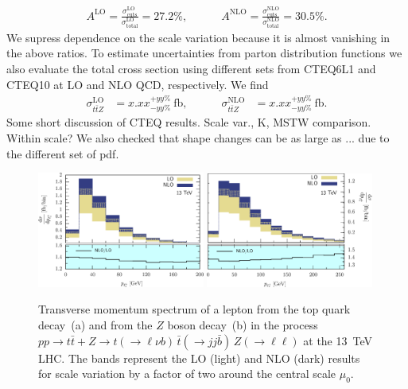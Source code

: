 \documentclass[preprint]{JHEP3} %
\def\ttb{t\bar{t}}
\newcommand{\be}{\begin{eqnarray}}
\newcommand{\ee}{\end{eqnarray}}
\begin{document}
\be
  A^\mathrm{LO} = \frac{\sigma_{\mathrm{cuts}}^\mathrm{LO}}{\sigma_{\mathrm{total}}^\mathrm{LO}} = 27.2 \% ,
  \quad\quad\quad
  A^\mathrm{NLO} = \frac{\sigma_{\mathrm{cuts}}^\mathrm{NLO}}{\sigma_{\mathrm{total}}^\mathrm{NLO}} = 30.5 \%.
\ee
We supress dependence on the scale variation because it is almost vanishing in the above ratios.
To estimate uncertainties from parton distribution functions we also evaluate the total cross section
using different sets from CTEQ6L1 \cite{} and CTEQ10 \cite{} at LO and NLO QCD, respectively. 
We find 
\be
\label{XsecNumCTEQ}
  \sigma_{\ttb Z}^\mathrm{LO} &= x.xx^{+yy\%}_{-yy\%}~\mathrm{fb},
  \quad\quad\quad
  \sigma_{\ttb Z}^\mathrm{NLO} &= x.xx^{+yy\%}_{-yy\%}~\mathrm{fb}.
\ee
Some short discussion of CTEQ results. Scale var., K, MSTW comparison. Within scale?
We also checked that shape changes can be as large as ... due to the different set of pdf.

\begin{figure}[t]
\centering %
\includegraphics[width=0.49\textwidth]{./LHC_53_Fig01.eps}
\hfill
\includegraphics[width=0.49\textwidth]{./LHC_53_Fig03.eps}
\caption{\label{fig:iii} Transverse momentum spectrum of a lepton from the top quark decay~(a) and from the $Z$ boson decay~(b) 
in the process $pp \to \ttb + Z \to t(\to \ell \nu b) \, \bar{t} (\to jj \bar{b}) \, Z(\to \ell \ell)$ at the 13~TeV LHC.
The bands represent the LO (light) and NLO (dark) results for scale variation by a factor of two around the central scale $\mu_0$.}
\end{figure}
\end{document}
